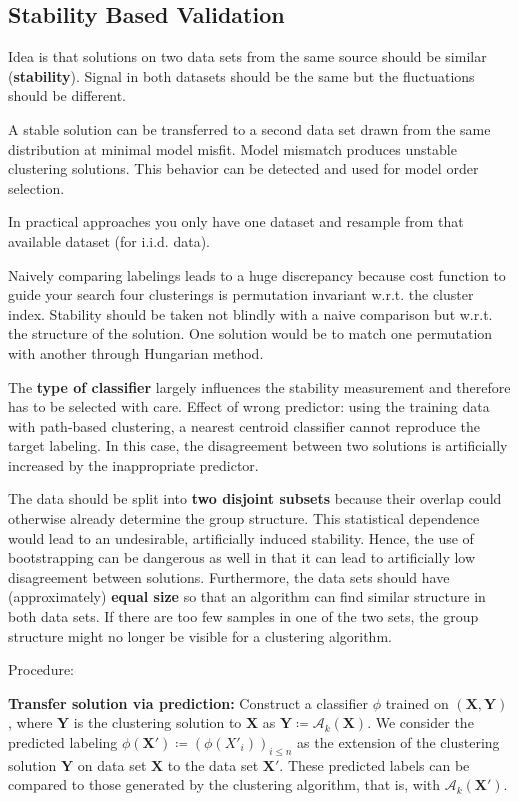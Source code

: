 \documentclass[12pt]{article}
\begin{document}
\subsection{Stability Based Validation}
\par Idea is that solutions on two data sets from the same source should be similar (\textbf{stability}). Signal in both datasets should be the same but the fluctuations should be different.
\par A stable solution can be transferred to a second data set drawn from the same distribution at minimal model misfit. Model mismatch produces unstable clustering solutions. This behavior can be detected and used for model order selection.
\par In practical approaches you only have one dataset and resample from that available dataset (for i.i.d. data).
\par Naively comparing labelings leads to a huge discrepancy because cost function to guide your search four clusterings is permutation invariant w.r.t. the cluster index. Stability should be taken not blindly with a naive comparison but w.r.t. the structure of the solution. One solution would be to match one permutation with another through Hungarian method.
\par The \textbf{type of classifier} largely influences the stability measurement and therefore has to be selected with care. Effect of wrong predictor: using the training data with path-based clustering, a nearest centroid classifier cannot reproduce the target labeling. In this case, the disagreement between two solutions is artificially increased by the inappropriate predictor.
\par The data should be split into \textbf{two disjoint subsets} because their overlap could otherwise already determine the group structure. This statistical dependence would lead to an undesirable, artificially induced stability. Hence, the use of bootstrapping can be dangerous as well in that it can lead to artificially low disagreement between solutions. Furthermore, the data sets should have (approximately) \textbf{equal size} so that an algorithm can find similar structure in both data sets. If there are too few samples in one of the two sets, the group structure might no longer be visible for a clustering algorithm.
\par Procedure:
\olb
\item \textbf{Transfer solution via prediction:} Construct a classifier $\phi$ trained on $(\mathbf{X,Y})$, where $\mathbf{Y}$ is the clustering solution to $\mathbf{X}$ as $\mathbf{Y} \coloneqq \mathcal{A}_k(\mathbf{X})$. We consider the predicted labeling $\phi(\mathbf{X}') \coloneqq (\phi(X'_i))_{i\leq n}$ as the extension of the clustering solution $\mathbf{Y}$ on data set $\mathbf{X}$ to the data set $\mathbf{X'}$. These predicted labels can be compared to those generated by the clustering algorithm, that is, with $\mathcal{A}_k(\mathbf{X}')$.
\end{document}

